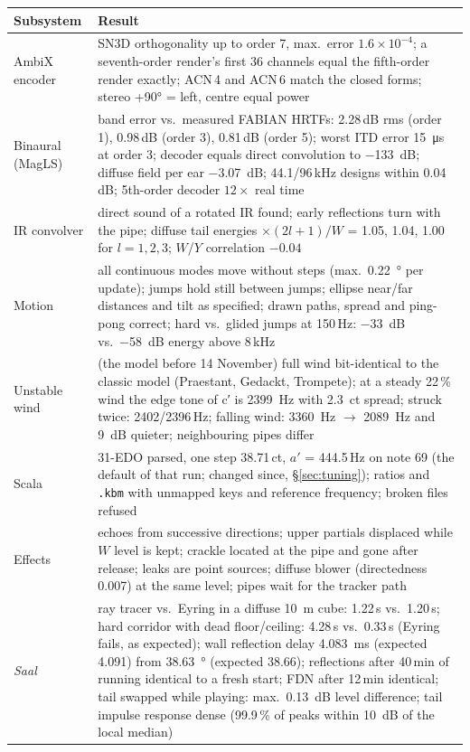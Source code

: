 \documentclass[11pt,a4paper,parskip=half,DIV=11,toc=bibliography]{scrartcl}
\newcommand{\ui}[1]{\emph{#1}}                 %
\newcommand{\code}[1]{\texttt{#1}}
\begin{document}
\begin{table}[!htb]
\centering\small
\begin{tabularx}{\linewidth}{@{}lX@{}}
\toprule
Subsystem & Result \\
\midrule
AmbiX encoder & SN3D orthogonality up to order 7, max.\ error $1.6\times10^{-4}$; a seventh-order render's first 36 channels equal the fifth-order render exactly; ACN\,4 and ACN\,6 match the closed forms; stereo +90° = left, centre equal power \\
Binaural (MagLS) & band error vs.\ measured FABIAN HRTFs: 2.28\,dB rms (order 1), 0.98\,dB (order 3), 0.81\,dB (order 5); worst ITD error \SI{15}{\micro s} at order 3; decoder equals direct convolution to \SI{-133}{dB}; diffuse field per ear \SI{-3.07}{dB}; 44.1/96\,kHz designs within 0.04\,dB; 5th-order decoder $12\times$ real time \\
IR convolver & direct sound of a rotated IR found; early reflections turn with the pipe; diffuse tail energies $\times(2l+1)/W$ = 1.05, 1.04, 1.00 for $l=1,2,3$; $W$/$Y$ correlation $-0.04$ \\
Motion & all continuous modes move without steps (max.\ \SI{0.22}{\degree} per update); jumps hold still between jumps; ellipse near/far distances and tilt as specified; drawn paths, spread and ping-pong correct; hard vs.\ glided jumps at 150\,Hz: \SI{-33}{dB} vs.\ \SI{-58}{dB} energy above 8\,kHz \\
Unstable wind & (the model before 14 November) full wind bit-identical to the classic model (Praestant, Gedackt, Trompete); at a steady 22\,\% wind the edge tone of c′ is \SI{2399}{Hz} with \SI{2.3}{ct} spread; struck twice: 2402/2396\,Hz; falling wind: \SI{3360}{Hz} $\rightarrow$ \SI{2089}{Hz} and \SI{9}{dB} quieter; neighbouring pipes differ \\
Scala & 31-EDO parsed, one step 38.71\,ct, $a'$ = 444.5\,Hz on note 69 (the default of that run; changed since, \S\ref{sec:tuning}); ratios and \code{.kbm} with unmapped keys and reference frequency; broken files refused \\
Effects & echoes from successive directions; upper partials displaced while $W$ level is kept; crackle located at the pipe and gone after release; leaks are point sources; diffuse blower (directedness 0.007) at the same level; pipes wait for the tracker path \\
\ui{Saal} & ray tracer vs.\ Eyring in a diffuse \SI{10}{m} cube: 1.22\,s vs.\ 1.20\,s; hard corridor with dead floor/ceiling: 4.28\,s vs.\ 0.33\,s (Eyring fails, as expected); wall reflection delay \SI{4.083}{ms} (expected 4.091) from \SI{38.63}{\degree} (expected 38.66); reflections after 40\,min of running identical to a fresh start; FDN after 12\,min identical; tail swapped while playing: max.\ \SI{0.13}{dB} level difference; tail impulse response dense (99.9\,\% of peaks within \SI{10}{dB} of the local median) \\

\end{tabularx}
\end{table}
\end{document}
